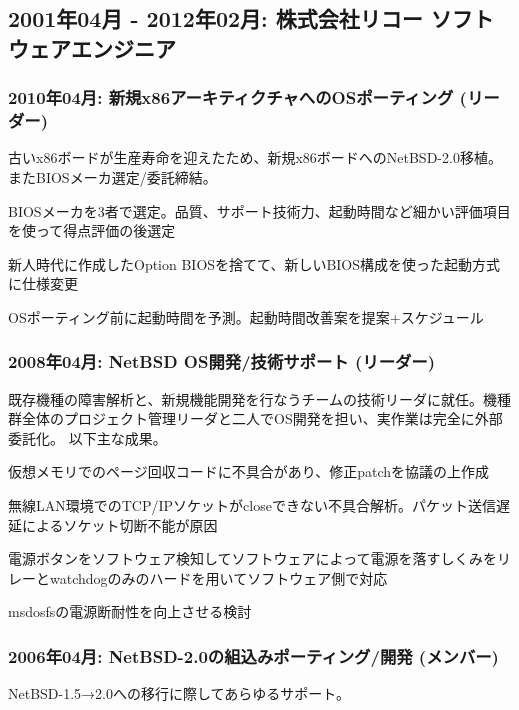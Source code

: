 \documentclass[letterpaper]{article}
\renewenvironment{itemize}{
  \begin{list}{}{
    \setlength{\leftmargin}{1.5em}
  }
}{
  \end{list}
}
\begin{document}
\subsection*{2001年04月 - 2012年02月: 株式会社リコー ソフトウェアエンジニア}
\subsubsection*{2010年04月: 新規x86アーキティクチャへのOSポーティング (リーダー)}
古いx86ボードが生産寿命を迎えたため、新規x86ボードへのNetBSD-2.0移植。またBIOSメーカ選定/委託締結。

\begin{itemize}
  \item BIOSメーカを3者で選定。品質、サポート技術力、起動時間など細かい評価項目を使って得点評価の後選定
  \item 新人時代に作成したOption BIOSを捨てて、新しいBIOS構成を使った起動方式に仕様変更
  \item OSポーティング前に起動時間を予測。起動時間改善案を提案+スケジュール
\end{itemize}

\subsubsection*{2008年04月: NetBSD OS開発/技術サポート (リーダー)}
既存機種の障害解析と、新規機能開発を行なうチームの技術リーダに就任。機種群全体のプロジェクト管理リーダと二人でOS開発を担い、実作業は完全に外部委託化。
以下主な成果。

\begin{itemize}
  \item 仮想メモリでのページ回収コードに不具合があり、修正patchを協議の上作成
  \item 無線LAN環境でのTCP/IPソケットがcloseできない不具合解析。パケット送信遅延によるソケット切断不能が原因
  \item 電源ボタンをソフトウェア検知してソフトウェアによって電源を落すしくみをリレーとwatchdogのみのハードを用いてソフトウェア側で対応
  \item msdosfsの電源断耐性を向上させる検討
\end{itemize}

\subsubsection*{2006年04月: NetBSD-2.0の組込みポーティング/開発 (メンバー)}
NetBSD-1.5→2.0への移行に際してあらゆるサポート。
\end{document}
